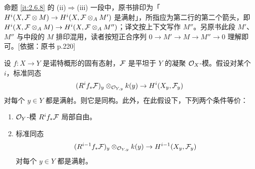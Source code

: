 \begin{tnote}
命题 \ref{it:2.6.8} 的 (ii)$\Rightarrow$(iii) 一段中，原书排印为「$H^i(X,\mathcal{F}\otimes M)\to H^i(X,\mathcal{F}\otimes_A M')$ 是满射」，所指应为第二行的第二个箭头，即 $H^i(X,\mathcal{F}\otimes_A M)\to H^i(X,\mathcal{F}\otimes_A M'')$；译文按上下文写作 $M''$。另原书此段 $M'$、$M''$ 与中段的 $M$ 排印混用，读者按短正合序列 $0\to M'\to M\to M''\to 0$ 理解即可。[依据：原书 p.220]
\end{tnote}

\begin{theorem}\label{it:2.6.9}
设 $f\colon X\to Y$ 是诺特概形的固有态射，$\mathcal{F}$ 是平坦于 $Y$ 的凝聚 $\mathcal{O}_X$-模。假设对某个 $i$，标准同态
\[
(R^if_*\mathcal{F})_y\otimes_{\mathcal{O}_{Y,y}}k(y)\to H^i(X_y,\mathcal{F}_y)
\]
对每个 $y\in Y$ 都是满射。则它是同构。此外，在此假设下，下列两个条件等价：
\begin{enumerate}[label=(\roman*)]
\item $\mathcal{O}_Y$-模 $R^if_*\mathcal{F}$ 局部自由。
\item 标准同态
\[
(R^{i-1}f_*\mathcal{F})_y\otimes_{\mathcal{O}_{Y,y}}k(y)\to H^{i-1}(X_y,\mathcal{F}_y)
\]
对每个 $y\in Y$ 都是满射。
\end{enumerate}
\end{theorem}

